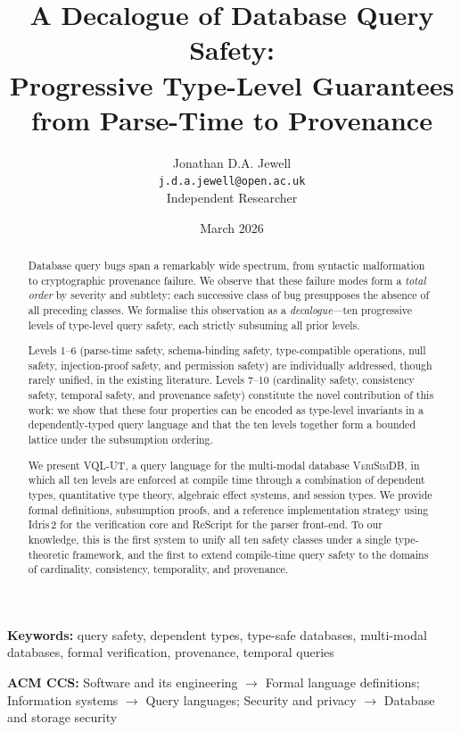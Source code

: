 \documentclass[11pt,a4paper]{article}
\title{%
  \textbf{A Decalogue of Database Query Safety:\\
  Progressive Type-Level Guarantees\\
  from Parse-Time to Provenance}%
}
\author{%
  Jonathan D.A. Jewell\\
  \texttt{j.d.a.jewell@open.ac.uk}\\
  \medskip
  \small{Independent Researcher}
}
\date{March 2026}
\newcommand{\VQL}{\textsc{VQL-UT}}
\newcommand{\VeriSimDB}{\textsc{VeriSimDB}}
\begin{document}
\maketitle

\begin{abstract}
Database query bugs span a remarkably wide spectrum, from syntactic
malformation to cryptographic provenance failure.  We observe that these
failure modes form a \emph{total order} by severity and subtlety: each
successive class of bug presupposes the absence of all preceding classes.
We formalise this observation as a \emph{decalogue}---ten progressive
levels of type-level query safety, each strictly subsuming all prior
levels.

Levels 1--6 (parse-time safety, schema-binding safety, type-compatible
operations, null safety, injection-proof safety, and permission safety)
are individually addressed, though rarely unified, in the existing
literature.  Levels 7--10 (cardinality safety, consistency safety,
temporal safety, and provenance safety) constitute the novel contribution
of this work: we show that these four properties can be encoded as
type-level invariants in a dependently-typed query language and that the
ten levels together form a bounded lattice under the subsumption
ordering.

We present \VQL{}, a query language for the multi-modal database
\VeriSimDB{}, in which all ten levels are enforced at compile time
through a combination of dependent types, quantitative type theory,
algebraic effect systems, and session types.  We provide formal
definitions, subsumption proofs, and a reference implementation strategy
using Idris\,2 for the verification core and ReScript for the parser
front-end.  To our knowledge, this is the first system to unify all ten
safety classes under a single type-theoretic framework, and the first to
extend compile-time query safety to the domains of cardinality,
consistency, temporality, and provenance.
\end{abstract}

\noindent
\textbf{Keywords:} query safety, dependent types, type-safe databases,
multi-modal databases, formal verification, provenance, temporal queries

\medskip
\noindent
\textbf{ACM CCS:} Software and its engineering $\to$ Formal language
definitions; Information systems $\to$ Query languages; Security and
privacy $\to$ Database and storage security
\end{document}
